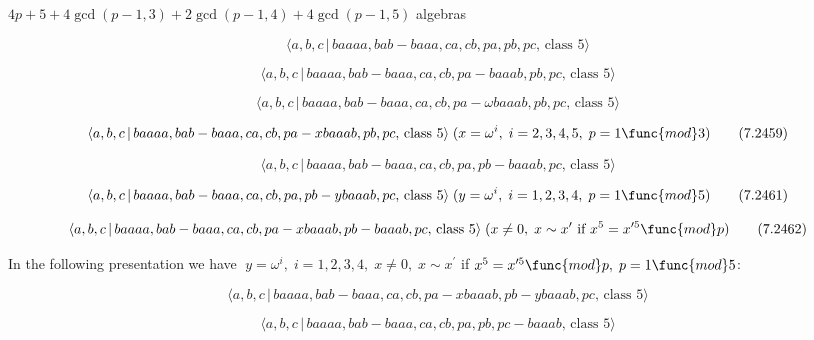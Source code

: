 \documentclass[10pt]{article}
\begin{document}
$4p+5+4\gcd (p-1,3)+2\gcd (p-1,4)+4\gcd (p-1,5)$ algebras

\begin{equation}
\langle a,b,c\,|\,baaaa,bab-baaa,ca,cb,pa,pb,pc,\,\text{class }5\rangle 
\tag{7.2456}
\end{equation}

\begin{equation}
\langle a,b,c\,|\,baaaa,bab-baaa,ca,cb,pa-baaab,pb,pc,\,\text{class }5\rangle
\tag{7.2457}
\end{equation}

\begin{equation}
\langle a,b,c\,|\,baaaa,bab-baaa,ca,cb,pa-\omega baaab,pb,pc,\,\text{class }%
5\rangle  \tag{7.2458}
\end{equation}

\begin{equation}
\langle a,b,c\,|\,baaaa,bab-baaa,ca,cb,pa-xbaaab,pb,pc,\,\text{class }%
5\rangle \;(x=\omega ^{i},\;i=2,3,4,5,\;p=1\func{mod}3)  \tag{7.2459}
\end{equation}

\begin{equation}
\langle a,b,c\,|\,baaaa,bab-baaa,ca,cb,pa,pb-baaab,pc,\,\text{class }5\rangle
\tag{7.2460}
\end{equation}

\begin{equation}
\langle a,b,c\,|\,baaaa,bab-baaa,ca,cb,pa,pb-ybaaab,pc,\,\text{class }%
5\rangle \;(y=\omega ^{i},\;i=1,2,3,4,\;p=1\func{mod}5)  \tag{7.2461}
\end{equation}

\begin{equation}
\langle a,b,c\,|\,baaaa,bab-baaa,ca,cb,pa-xbaaab,pb-baaab,pc,\,\text{class }%
5\rangle \;(x\neq 0,\;x\sim x^{\prime }\text{ if }x^{5}=x^{\prime 5}\func{mod%
}p)  \tag{7.2462}
\end{equation}

In the following presentation we have $\;y=\omega ^{i},\;i=1,2,3,4,\;x\neq
0,\;x\sim x^{\prime }$ if $x^{5}=x^{\prime 5}\func{mod}p,\;p=1\func{mod}5$:

\begin{equation}
\langle a,b,c\,|\,baaaa,bab-baaa,ca,cb,pa-xbaaab,pb-ybaaab,pc,\,\text{class }%
5\rangle  \tag{7.2463}
\end{equation}

\begin{equation}
\langle a,b,c\,|\,baaaa,bab-baaa,ca,cb,pa,pb,pc-baaab,\,\text{class }5\rangle
\tag{7.2464}
\end{equation}
\end{document}
